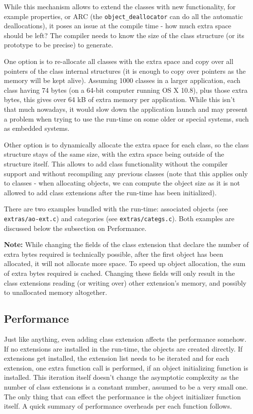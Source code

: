 While this mechanism allows to extend the classes with new functionality, for example properties, or ARC (the \verb=object_deallocator= can do all the automatic deallocations), it poses an issue at the compile time - how much extra space should be left? The compiler needs to know the size of the class structure (or its prototype to be precise) to generate.

One option is to re-allocate all classes with the extra space and copy over all pointers of the class internal structures (it is enough to copy over pointers as the memory will be kept alive). Assuming 1000 classes in a larger application, each class having 74 bytes (on a 64-bit computer running OS X 10.8), plus those extra bytes, this gives over 64 kB of extra memory per application. While this isn't that much nowadays, it would slow down the application launch and may present a problem when trying to use the run-time on some older or special systems, such as embedded systems.

Other option is to dynamically allocate the extra space for each class, so the class structure stays of the same size, with the extra space being outside of the structure itself. This allows to add class functionality without the compiler support and without recompiling any previous classes (note that this applies only to classes - when allocating objects, we can compute the object size as it is not allowed to add class extensions after the run-time has been initialized).

There are two examples bundled with the run-time: associated objects (see \verb=extras/ao-ext.c=) and categories (see \texttt{extras/categs.c}). Both examples are discussed below the subsection on Performance.

\textbf{Note:} While changing the fields of the class extension that declare the number of extra bytes required is technically possible, after the first object has been allocated, it will not allocate more space. To speed up object allocation, the sum of extra bytes required is cached. Changing these fields will only result in the class extensions reading (or writing over) other extension's memory, and possibly to unallocated memory altogether.

\subsection{Performance}
Just like anything, even adding class extension affects the performance somehow. If no extensions are installed in the run-time, the objects are created directly. If extensions get installed, the extension list needs to be iterated and for each extension, one extra function call is performed, if an object initializing function is installed. This iteration itself doesn't change the asymptotic complexity as the number of class extensions is a constant number, assumed to be a very small one. The only thing that can effect the performance is the object initializer function itself. A quick summary of performance overheads per each function follows.

